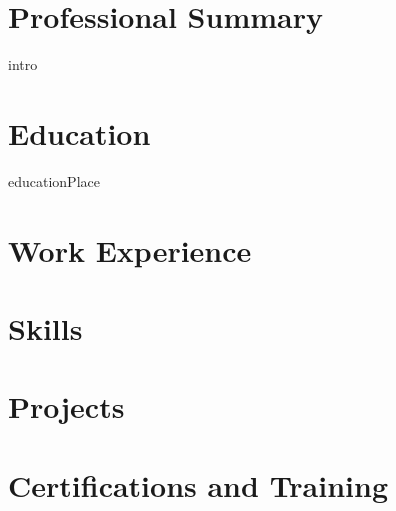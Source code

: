 \documentclass[11pt, a4paper, sans]{moderncv}
\begin{document}
\makecvtitle

\section{Professional Summary}
{intro}

\section{Education}
{\normalfont educationPlace}

\section{Work Experience}
\vspace{-\baselineskip}

\section{Skills}

\section{Projects}
\vspace{-\baselineskip}

\section{Certifications and Training}
\end{document}
